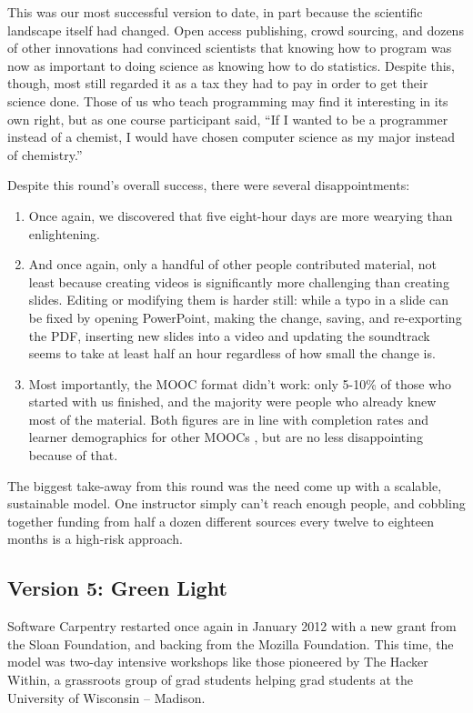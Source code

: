 \documentclass[10pt,a4paper,twocolumn]{article}
\begin{document}
This was our most successful version to date, in part because the
scientific landscape itself had changed. Open access publishing, crowd
sourcing, and dozens of other innovations had convinced scientists
that knowing how to program was now as important to doing science as
knowing how to do statistics. Despite this, though, most still
regarded it as a tax they had to pay in order to get their science
done. Those of us who teach programming may find it interesting in its
own right, but as one course participant said, ``If I wanted to be a
programmer instead of a chemist, I would have chosen computer science
as my major instead of chemistry.''

Despite this round's overall success, there were several
disappointments:

\begin{enumerate}
\item
  Once again, we discovered that five eight-hour days are more wearying
  than enlightening.
\item
  And once again, only a handful of other people contributed material,
  not least because creating videos is significantly more challenging
  than creating slides. Editing or modifying them is harder still:
  while a typo in a slide can be fixed by opening PowerPoint, making
  the change, saving, and re-exporting the PDF, inserting new slides
  into a video and updating the soundtrack seems to take at least half
  an hour regardless of how small the change is.
\item
  Most importantly, the MOOC format didn't work: only 5-10\% of those
  who started with us finished, and the majority were people who already
  knew most of the material. Both figures are in line with completion
  rates and learner demographics for other MOOCs \cite{jordan2013}, but
  are no less disappointing because of that.
\end{enumerate}

The biggest take-away from this round was the need come up with a
scalable, sustainable model. One instructor simply can't reach enough
people, and cobbling together funding from half a dozen different
sources every twelve to eighteen months is a high-risk approach.

\subsection*{Version 5: Green Light}

Software Carpentry restarted once again in January 2012 with a new
grant from the Sloan Foundation, and backing from the Mozilla
Foundation. This time, the model was two-day intensive workshops like
those pioneered by The Hacker Within, a grassroots group of grad
students helping grad students at the University of Wisconsin --
Madison.
\end{document}
